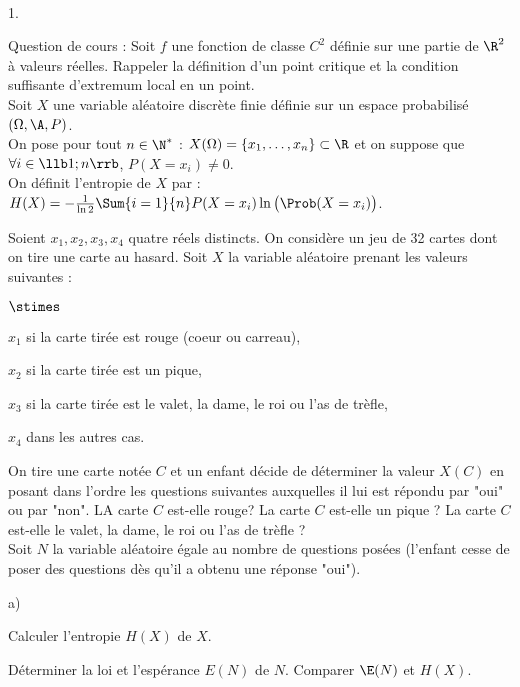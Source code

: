 \begin{exerciceAP}~
  \begin{noliste}{1.}
    \setlength{\itemsep}{2mm}
  \item Question de cours : Soit $f$ une fonction de classe $C^2$
    définie sur une partie de $\R^2$ à valeurs réelles. Rappeler la
    définition d'un point critique et la condition suffisante
    d'extremum local en un point.\\

    Soit $X$ une variable aléatoire discrète finie définie sur un
    espace probabilisé $(\Omega , \A , P)$.\\
    On pose pour tout $n \in \N^*$ : $X ( \Omega ) = \{ x_1 , \dots ,
    x_n \} \subset \R$ et on suppose que $\forall i \in \llb 1 ; n
    \rrb$, $P (X=x_i) \neq 0$.\\

    On définit l'entropie de $X$ par : $ H(X) = - \frac{ 1 }{ \ln 2 }
    \Sum{i=1}{n} P (X=x_i) \ln \big( \Prob(X=x_i) \big)$.

  \item Soient $x_1 , x_2 , x_3 , x_4$ quatre réels distincts. On
    considère un jeu de 32 cartes dont on tire une carte au
    hasard. Soit $X$ la variable aléatoire prenant les valeurs
    suivantes : 
    \begin{noliste}{$\stimes$}
    \item $x_1$ si la carte tirée est rouge (coeur ou carreau),
    \item $x_2$ si la carte tirée est un pique,
    \item $x_3$ si la carte tirée est le valet, la dame, le roi ou
      l'as de trèfle,
    \item $x_4$ dans les autres cas.
    \end{noliste}

    On tire une carte notée $C$ et un enfant décide de déterminer la
    valeur $X(C)$ en posant dans l'ordre les questions suivantes
    auxquelles il lui est répondu par "oui" ou par "non". LA carte $C$
    est-elle rouge? La carte $C$ est-elle un pique ? La carte $C$
    est-elle le valet, la dame, le roi ou l'as de trèfle ? \\
    Soit $N$ la variable aléatoire égale au nombre de questions posées
    (l'enfant cesse de poser des questions dès qu'il a obtenu une
    réponse "oui"). 

    \begin{noliste}{a)}
    \setlength{\itemsep}{2mm}
    \item Calculer l'entropie $H(X)$ de $X$.
    \item Déterminer la loi et l'espérance $E (N)$ de $N$. Comparer
      $\E(N)$ et $H(X)$.
    \end{noliste}


\end{noliste}
\end{exerciceAP}
